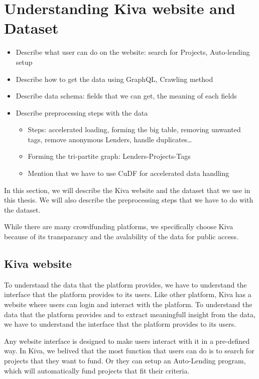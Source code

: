 \section{Understanding Kiva website and Dataset}

\begin{itemize}
    \item Describe what user can do on the website: search for Projects, Auto-lending setup
    \item Describe how to get the data using GraphQL, Crawling method
    \item Describe data schema: fields that we can get, the meaning of each fields
    \item Describe preprocessing steps with the data
          \begin{itemize}
              \item Steps: accelerated loading, forming the big table, removing unwanted tags, remove anonymous Lenders, handle duplicates\dots
              \item Forming the tri-partite graph: Lenders-Projects-Tags
              \item Mention that we have to use CuDF for accelerated data handling
          \end{itemize}
\end{itemize}

In this section, we will describe the Kiva website and the dataset that we use in this thesis.
We will also describe the preprocessing steps that we have to do with the dataset.

While there are many crowdfunding platforms,
we specifically choose Kiva because of its transparancy and the avalability of the data for public access.

\subsection{Kiva website}

To understand the data that the platform provides, we have to understand the interface that the platform provides to its users.
Like other platform, Kiva has a website where users can login and interact with the platform.
To understand the data that the platform provides and to extract meaningfull insight from the data,
we have to understand the interface that the platform provides to its users.

Any website interface is designed to make users interact with it in a pre-defined way.
In Kiva, we belived that the most function that users can do is to search for projects that they want to fund.
Or they can setup an Auto-Lending program, which will automatically fund projects that fit their criteria.



